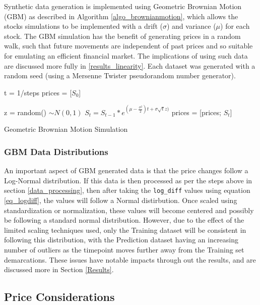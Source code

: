 \documentclass[a4paper,11pt,oneside]{article}
\theoremstyle{plain}
\theoremstyle{definition}
\begin{document}
	Synthetic data generation is implemented using Geometric Brownian Motion (GBM) as described in Algorithm \ref{algo_brownianmotion}, which allows the stocks simulations to be implemented with a drift ($\sigma$) and variance ($\mu$) for each stock. The GBM simulation has the benefit of generating prices in a random walk, such that future movements are independent of past prices and so suitable for emulating an efficient financial market. The implications of using such data are discussed more fully in \ref{results_linearity}. Each dataset was generated with a random seed (using a Mersenne Twister pseudorandom number generator). \newline
	
	\begin{algorithm}[H]
		
		t = 1/steps\;
		prices = [$S_0$]\;
		
		{
			z = random()  $\sim N(0,1)$\;
			$S_t = S_{t-1}*e^{(\mu - \frac {\sigma^2}{2})t + \sigma  \sqrt{t}  z)}$\;
			prices = [prices; $S_t$]\;
		}
		\label{algo_brownianmotion}
		\caption{Geometric Brownian Motion Simulation}
	\end{algorithm}
	
	\subsubsection{GBM Data Distributions}
	
	An important aspect of GBM generated data is that the price changes follow a Log-Normal distribution. If this data is then processed as per the steps above in section \ref{data_processing}, then after taking the \texttt{log\_diff} values using equation \eqref{eq_logdiff}, the values will follow a Normal distirbution. Once scaled using standardization or normalization, these values will become centered and possibly be following a standard normal distribution. However, due to the effect of the limited scaling techniques used, only the Training dataset will be consistent in following this distribution, with the Prediction dataset having an increasing number of outliers as the timepoint moves further away from the Training set demarcations. These issues have notable impacts through out the results, and are discussed more in Section \ref{Results}.
	
	\subsection{Price Considerations}\label{data_prices}
	
\end{document}
